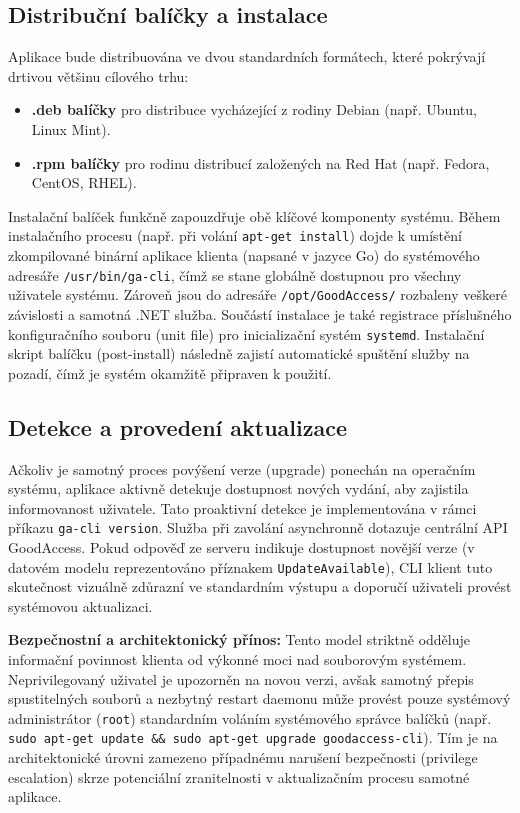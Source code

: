 \subsection{Distribuční balíčky a instalace}

Aplikace bude distribuována ve dvou standardních formátech, které pokrývají drtivou většinu cílového trhu:
\begin{itemize}
    \item \textbf{.deb balíčky} pro distribuce vycházející z rodiny Debian (např. Ubuntu, Linux Mint).
    \item \textbf{.rpm balíčky} pro rodinu distribucí založených na Red Hat (např. Fedora, CentOS, RHEL).
\end{itemize}

Instalační balíček funkčně zapouzdřuje obě klíčové komponenty systému. Během instalačního procesu (např. při volání \texttt{apt-get install}) dojde k umístění zkompilované binární aplikace klienta (napsané v jazyce Go) do systémového adresáře \texttt{/usr/\allowbreak{}bin/\allowbreak{}ga-cli}, čímž se stane globálně dostupnou pro všechny uživatele systému. Zároveň jsou do adresáře \texttt{/opt/\allowbreak{}GoodAccess/} rozbaleny veškeré závislosti a samotná .NET služba. Součástí instalace je také registrace příslušného konfiguračního souboru (unit file) pro inicializační systém \texttt{systemd}. Instalační skript balíčku (post-install) následně zajistí automatické spuštění služby na pozadí, čímž je systém okamžitě připraven k použití.

\subsection{Detekce a provedení aktualizace}

Ačkoliv je samotný proces povýšení verze (upgrade) ponechán na operačním systému, aplikace aktivně detekuje dostupnost nových vydání, aby zajistila informovanost uživatele. Tato proaktivní detekce je implementována v rámci příkazu \texttt{ga-cli version}. Služba při zavolání asynchronně dotazuje centrální API \mbox{GoodAccess}. Pokud odpověď ze serveru indikuje dostupnost novější verze (v datovém modelu reprezentováno příznakem \texttt{UpdateAvailable}), CLI klient tuto skutečnost vizuálně zdůrazní ve standardním výstupu a doporučí uživateli provést systémovou aktualizaci.

\textbf{Bezpečnostní a architektonický přínos:} Tento model striktně odděluje informační povinnost klienta od výkonné moci nad souborovým systémem. Neprivilegovaný uživatel je upozorněn na novou verzi, avšak samotný přepis spustitelných souborů a nezbytný restart daemonu může provést pouze systémový administrátor (\texttt{root}) standardním voláním systémového správce balíčků (např. \texttt{sudo apt-get update \&\& sudo apt-get upgrade goodaccess-cli}). Tím je na architektonické úrovni zamezeno případnému narušení bezpečnosti (privilege escalation) skrze potenciální zranitelnosti v aktualizačním procesu samotné aplikace.

